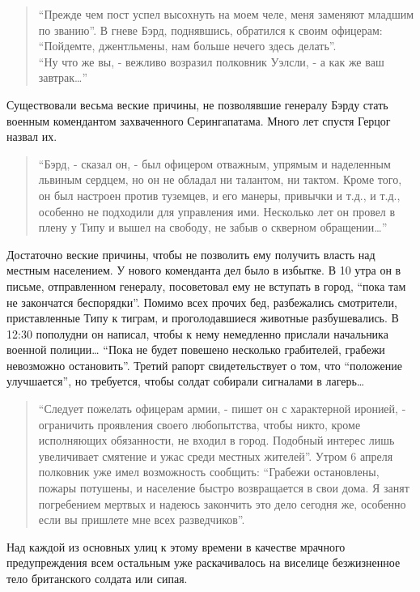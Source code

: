 \documentclass[
  oneside,
  12pt,
  titlepage]{book}
\begin{document}
\begin{quote}
``Прежде чем пост успел высохнуть на моем челе, меня заменяют младшим по званию''. В гневе Бэрд, поднявшись, обратился к своим офицерам: ``Пойдемте, джентльмены, нам больше нечего здесь делать''.\\
``Ну что же вы, - вежливо возразил полковник Уэлсли, - а как же ваш завтрак\ldots{}''
\end{quote}

Существовали весьма веские причины, не позволявшие генералу Бэрду стать военным комендантом захваченного Серингапатама. Много лет спустя Герцог назвал их.

\begin{quote}
``Бэрд, - сказал он, - был офицером отважным, упрямым и наделенным львиным сердцем, но он не обладал ни талантом, ни тактом. Кроме того, он был настроен против туземцев, и его манеры, привычки и т.д., и т.д., особенно не подходили для управления ими. Несколько лет он провел в плену у Типу и вышел на свободу, не забыв о скверном обращении\ldots{}''
\end{quote}

Достаточно веские причины, чтобы не позволить ему получить власть над местным населением. У нового коменданта дел было в избытке. В 10 утра он в письме, отправленном генералу, посоветовал ему не вступать в город, ``пока там не закончатся беспорядки''. Помимо всех прочих бед, разбежались смотрители, приставленные Типу к тиграм, и проголодавшиеся животные разбушевались. В 12:30 пополудни он написал, чтобы к нему немедленно прислали начальника военной полиции\ldots{} ``Пока не будет повешено несколько грабителей, грабежи невозможно остановить''. Третий рапорт свидетельствует о том, что ``положение улучшается'', но требуется, чтобы солдат собирали сигналами в лагерь\ldots{}

\begin{quote}
``Следует пожелать офицерам армии, - пишет он с характерной иронией, - ограничить проявления своего любопытства, чтобы никто, кроме исполняющих обязанности, не входил в город. Подобный интерес лишь увеличивает смятение и ужас среди местных жителей''. Утром 6 апреля полковник уже имел возможность сообщить: ``Грабежи остановлены, пожары потушены, и население быстро возвращается в свои дома. Я занят погребением мертвых и надеюсь закончить это дело сегодня же, особенно если вы пришлете мне всех разведчиков''.
\end{quote}

Над каждой из основных улиц к этому времени в качестве мрачного предупреждения всем остальным уже раскачивалось на виселице безжизненное тело британского солдата или сипая.
\end{document}
